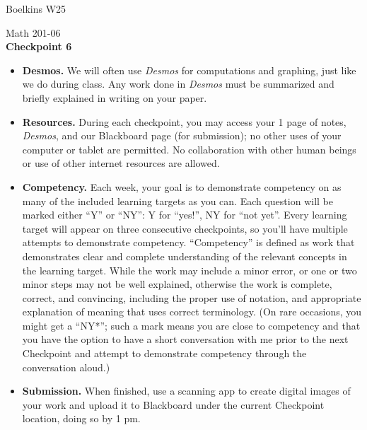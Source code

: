\documentclass[11 pt]{article}
\begin{document}
 \hfill Boelkins  W25\\
 
\begin{center}
Math 201-06 \\
{\bf Checkpoint 6}
\end{center}



\begin{itemize}
	
	\item {\bf Desmos.} We will often use \emph{Desmos} for computations and graphing, just like we do during class.  Any work done in \emph{Desmos} must be summarized and briefly explained in writing on your paper.  
	
	\item {\bf Resources.} During each checkpoint, you may access your 1 page of notes, \emph{Desmos}, and our Blackboard page (for submission); no other uses of your computer or tablet are permitted.  No collaboration with other human beings or use of other internet resources are allowed.
	
	\item {\bf Competency.} Each week, your goal is to demonstrate competency on as many of the included learning targets as you can.  Each question will be marked either ``Y'' or ``NY'': Y for ``yes!'', NY for ``not yet''.  Every learning target will appear on three consecutive checkpoints, so you'll have multiple attempts to demonstrate competency.  ``Competency'' is defined as work that demonstrates clear and complete understanding of the relevant concepts in the learning target. While the work may include a minor error, or one or two minor steps may not be well explained, otherwise the work is complete, correct, and convincing, including the proper use of notation, and appropriate explanation of meaning that uses correct terminology.  (On rare occasions, you might get a ``NY*''; such a mark means you are close to competency and that you have the option to have a short conversation with me prior to the next Checkpoint and attempt to demonstrate competency through the conversation aloud.)	
	
	\item {\bf Submission.}  When finished, use a scanning app to create digital images of your work and upload it to Blackboard under the current Checkpoint location, doing so by 1 pm.
	
\end{itemize}
\end{document}
